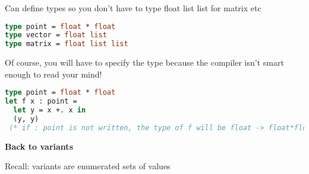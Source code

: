 \documentclass[12pt,a4paper]{article} %
\begin{document}
Can define types so you don't have to type float list list for matrix etc
\begin{lstlisting}[language=Caml]
type point = float * float
type vector = float list
type matrix = float list list
\end{lstlisting}
Of course, you will have to specify the type because the compiler isn't smart enough to read your mind!
\begin{lstlisting}[language=Caml]
type point = float * float
let f x : point =
  let y = x +. x in
  (y, y)
 (* if : point is not written, the type of f will be float -> float*float instead of float -> point!*)
\end{lstlisting}
\textbf{Back to variants}

Recall: variants are enumerated sets of values
\end{document}
